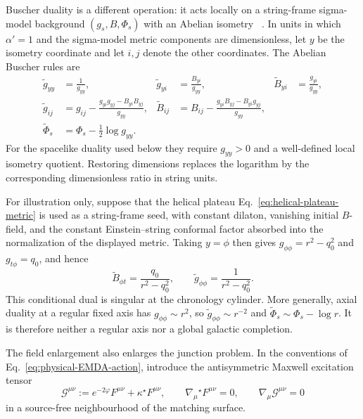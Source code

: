 Buscher duality is a different operation: it acts locally on a string-frame
sigma-model background $(g_s,B,\Phi_s)$ with an Abelian isometry
~\cite{Buscher1987PLB,Buscher1988PLB}. In units in which $\alpha'=1$ and the
sigma-model metric components are dimensionless, let $y$ be the isometry
coordinate and let $i,j$ denote the other coordinates. The Abelian Buscher
rules are
\begin{align}
 \widetilde g_{yy}&=\frac{1}{g_{yy}},
 &
 \widetilde g_{yi}&=\frac{B_{yi}}{g_{yy}},
 &
 \widetilde B_{yi}&=\frac{g_{yi}}{g_{yy}},
 \label{eq:physical-Buscher-y}\\
 \widetilde g_{ij}
 &=g_{ij}-\frac{g_{yi}g_{yj}-B_{yi}B_{yj}}{g_{yy}},
 &
 \widetilde B_{ij}
 &=B_{ij}-\frac{g_{yi}B_{yj}-B_{yi}g_{yj}}{g_{yy}},
 \label{eq:physical-Buscher-transverse}\\
 \widetilde\Phi_s
 &=\Phi_s-\frac12\log g_{yy}.
 \label{eq:physical-Buscher-dilaton}
\end{align}
For the spacelike duality used below they require $g_{yy}>0$ and a
well-defined local isometry quotient.
Restoring dimensions replaces the logarithm by the corresponding
dimensionless ratio in string units.

For illustration only, suppose that the helical plateau
Eq.~\eqref{eq:helical-plateau-metric} is used as a string-frame seed, with
constant dilaton, vanishing initial $B$-field, and the constant
Einstein--string conformal factor absorbed into the normalization of the
displayed metric. Taking $y=\phi$ then gives
$g_{\phi\phi}=r^2-q_0^2$ and $g_{t\phi}=q_0$, and hence
\begin{equation}
 \widetilde B_{\phi t}=\frac{q_0}{r^2-q_0^2},
 \qquad
 \widetilde g_{\phi\phi}=\frac{1}{r^2-q_0^2}.
 \label{eq:physical-Buscher-plateau}
\end{equation}
This conditional dual is singular at the chronology cylinder. More generally, axial
duality at a regular fixed axis has $g_{\phi\phi}\sim r^2$, so
$\widetilde g_{\phi\phi}\sim r^{-2}$ and
$\widetilde\Phi_s\sim\Phi_s-\log r$. It is therefore neither a regular
axis nor a global galactic completion.

The field enlargement also enlarges the junction problem. In the
conventions of Eq.~\eqref{eq:physical-EMDA-action}, introduce the
antisymmetric Maxwell excitation tensor
\begin{equation}
 \mathcal G^{\mu\nu}
 :=e^{-2\varphi}F^{\mu\nu}
 +\kappa{}^\star F^{\mu\nu},
 \qquad
 \nabla_\mu{}^\star F^{\mu\nu}=0,
 \qquad
 \nabla_\mu\mathcal G^{\mu\nu}=0
\label{eq:physical-EMDA-excitation}
\end{equation}
in a source-free neighbourhood of the matching surface.

